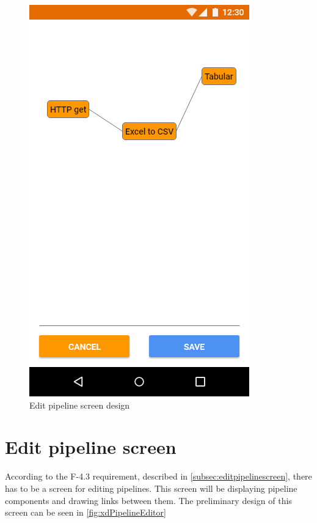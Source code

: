 \begin{figure}
\begin{minipage}[b]{0.32\textwidth}
    	\includegraphics[width=\textwidth]{pics/xd/Pipeline editor.png}
    	\caption[Edit pipeline screen]{Edit pipeline screen design}\label{fig:xdPipelineEditor}
    \end{minipage}
\end{figure}

\section{Edit pipeline screen}
According to the F-4.3 requirement, described in \autoref{subsec:editpipelinescreen}, there has to be a screen for editing pipelines.
This screen will be displaying pipeline components and drawing links between them.
The preliminary design of this screen can be seen in \autoref{fig:xdPipelineEditor}


